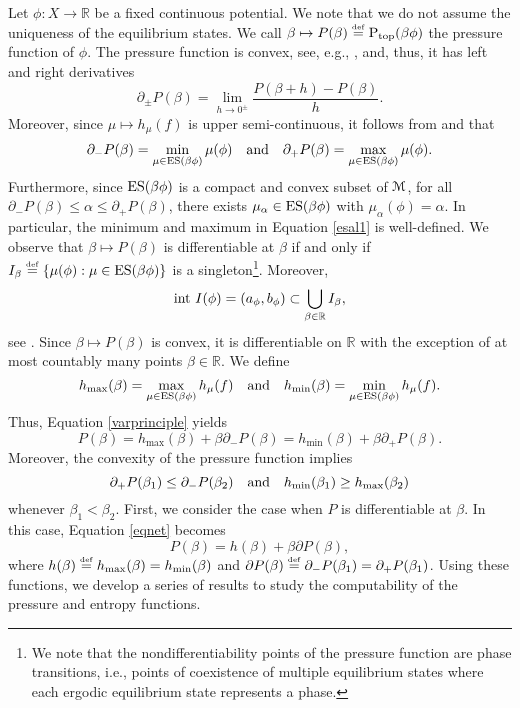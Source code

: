 \documentclass[11pt, reqno]{amsart}
\newcommand{\eqdef}{\stackrel{\scriptscriptstyle\rm def}{=}}
\newcommand{\cM}{\EuScript{M}}
\newcommand{\bR}{{\mathbb R}}
\def\Ptop{{\rm P_{\rm top}}}
\def\ES{{\rm ES}}
\def\inn{{\rm int}}
\def\inn{{\rm int\ }}
\begin{document}
Let $\phi:X\to\bR$ be a fixed continuous potential. We note that we do not  assume the uniqueness of the equilibrium states. We call $\beta\mapsto P(\beta)\eqdef \Ptop(\beta\phi)$ the pressure function of $\phi$. The pressure function is convex, see, e.g., \cite{Wal:81}, and, thus, it has left and right derivatives 
$$
\partial_\pm P(\beta)=\lim_{h\to 0^\pm}\frac{ P(\beta+ h)-P(\beta)}{h}.
$$
 Moreover, since $\mu\mapsto h_\mu(f)$ is upper semi-continuous, it follows from \cite[Proposition 1]{Je} and \cite[Lemma 1]{Wal92} that
\begin{equation}\label{esal1}
\partial_-P(\beta)=\min_{\mu\in \ES(\beta\phi)} \mu(\phi)\quad\text{and}\quad\partial_+P(\beta)=\max_{\mu\in \ES(\beta\phi)} \mu(\phi).
\end{equation}
Furthermore, since $\ES(\beta\phi)$ is a compact and convex subset of $\cM$, for all $\partial_-P(\beta)\leq \alpha\leq \partial_+P(\beta)$, there exists $\mu_\alpha\in \ES(\beta\phi)$ with $\mu_\alpha(\phi)=\alpha$. In particular, the minimum and maximum in Equation \eqref{esal1} is well-defined. 
We observe that $\beta\mapsto P(\beta)$ is differentiable at $\beta$ if and only if $I_{\beta}\eqdef\{\mu(\phi):\mu\in \ES(\beta\phi)\}$ is a singleton\footnote{We note that the nondifferentiability points of the pressure function are phase transitions, i.e., points of coexistence of multiple equilibrium states where each ergodic equilibrium state represents a phase.}.     
 Moreover,
\begin{equation}\label{eqJencor2}
\inn I(\phi)=(a_\phi,b_\phi)\subset \bigcup_{\beta\in \bR} I_\beta,
\end{equation}
see \cite[Corollary 2]{Je}.
Since   $\beta\mapsto P(\beta)$ is convex, it is differentiable on $\bR$ with the exception of at most countably many points $\beta\in \bR$. We define 
$$
h_{\rm max}(\beta)=\max_{\mu\in \ES(\beta\phi)} h_\mu(f) \quad\text{and}\quad h_{\rm min}(\beta)=\min_{\mu\in \ES(\beta\phi)} h_\mu(f).$$
Thus, Equation \eqref{varprinciple} yields
\begin{equation}\label{eqnet}
P(\beta)=h_{\max}(\beta)+\beta \partial_-P(\beta)=h_{\min}(\beta)+\beta \partial_+P(\beta).
\end{equation}
Moreover, the  convexity of the pressure function implies 
\begin{equation}\label{eqmon}
\partial_+P(\beta_1)\leq \partial_-P(\beta_2)\quad \text{and}\quad h_{\rm min}(\beta_1)\geq h_{\max}(\beta_2)
\end{equation}
whenever $\beta_1<\beta_2$.  First, we consider the case when $P$ is differentiable at $\beta$. In this case, Equation \eqref{eqnet} becomes
\begin{equation}\label{eqpresdiff}
P(\beta)=h(\beta)+\beta \partial P(\beta),
\end{equation}
where $h(\beta)\eqdef h_{\max}(\beta)=h_{\min}(\beta)$ and $\partial P(\beta)\eqdef \partial_-P(\beta_1)=\partial_+P(\beta_1)$.  Using these functions, we develop a series of results to study the computability of the pressure and entropy functions.
\end{document}
